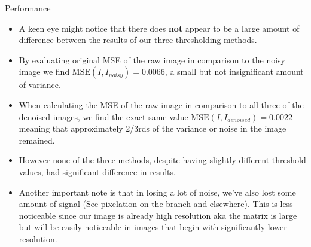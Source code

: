 \documentclass[aspectratio=169,xcolor=dvipsnames]{beamer}
\begin{document}
	
	\begin{frame}{Performance}
		\begin{itemize}
			\item A keen eye might notice that there does \textbf{not} appear to be a large amount of difference between the results of our three thresholding methods.
			\item By evaluating original MSE of the raw image in comparison to the noisy image we find $\text{MSE}(I, I_{noisy}) = 0.0066$, a small but not insignificant amount of variance.
			\item When calculating the MSE of the raw image in comparison to all three of the denoised images, we find the exact same value $\text{MSE}(I, I_{denoised}) = 0.0022$ meaning that approximately 2/3rds of the variance or noise in the image remained. 
			\item However none of the three methods, despite having slightly different threshold values, had significant difference in results.
			\item Another important note is that in losing a lot of noise, we've also lost some amount of signal (See pixelation on the branch and elsewhere). This is less noticeable since our image is already high resolution aka the matrix is large but will be easily noticeable in images that begin with significantly lower resolution.
		\end{itemize}
	\end{frame}

	
\end{document}
